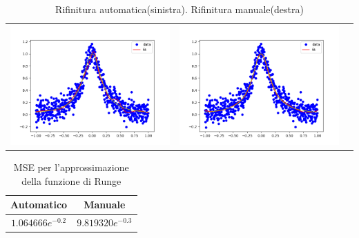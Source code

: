 \documentclass[../main.tex]{subfiles}
\begin{document}
\begin{table}
    \centering
    \caption{Rifinitura automatica(sinistra). Rifinitura manuale(destra)\label{tab:runge_fit}}
        \begin{tabular}{ccc}
             \includegraphics[width=0.45\linewidth]{Immagini/esempi/runge_auto.png}
            & \includegraphics[width=0.45\linewidth]{Immagini/esempi/runge_mano.png}\\[-4pt]
        \end{tabular}%
\end{table}

\begin{table}[h!]
    \centering
    \caption{MSE per l'approssimazione della funzione di Runge}\label{tab:runge_mse}
     \begin{tabular}{||c c ||} 
     \hline
     Automatico & Manuale \\ [0.5ex] 
     \hline\hline
    $ 1.064666e^{-0.2}$ & $9.819320e^{-0.3}$ \\  [1ex] 
     \hline
     \end{tabular}
    \end{table}
\end{document}
